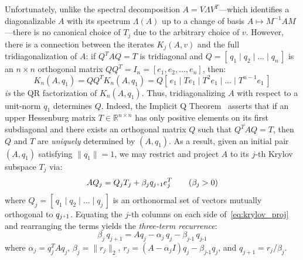\documentclass[10pt]{article}
\numberwithin{equation}{section}
\newcommand{\+}{%
	\raisebox{0.18ex}{\scaleobj{0.55}{+}}
}
\theoremstyle{definition}
\begin{document}
Unfortunately, unlike the spectral decomposition $A = V \Lambda V^T$---which identifies a diagonalizable $A$ with its spectrum $\Lambda(A)$ up to a change of basis $A \mapsto M^{-1} A M$---there is no canonical choice of $T_j$ due to the arbitrary choice of $v$. 
However, there is a connection between the iterates $K_j(A,v)$ and the full tridiagonalization of $A$: if $Q^T A Q = T$ is tridiagonal and $Q= [\, q_1 \mid q_2 \mid \dots \mid q_n \,]$ is an $n \times n$ orthogonal matrix $Q Q^T = I_n = [e_1, e_2, \dots, e_n]$, then:
\begin{equation}
	K_n(A, q_1) = Q Q^T K_n(A, q_1) = Q[ \, e_1 \mid T e_1 \mid T^2 e_1 \mid \dots \mid T^{n-1} e_1 \, ]
\end{equation}
\emph{is} the QR factorization of $K_n(A, q_1)$. Thus, tridiagonalizing $A$ with respect to a unit-norm $q_1$ determines $Q$. 
Indeed, the Implicit Q Theorem~\cite{golub2013matrix} asserts that if an upper Hessenburg matrix $T \in \mathbb{R}^{n \times n}$ has only positive elements on its first subdiagonal and there exists an orthogonal matrix $Q$ such that $Q^T A Q = T$, then $Q$ and $T$ are \emph{uniquely} determined by $(A, q_1)$. 
As a result, given an initial pair $(A, q_1)$ satisfying $\lVert q_1 \rVert = 1$, we may restrict and project $A$ to its $j$-th Krylov subspace $T_j$ via: 
\begin{equation}\label{eq:krylov_proj}
	A Q_j = Q_j T_j + \beta_j q_{j\+1} e_{j}^T \quad\quad (\beta_j > 0)
\end{equation}
where $Q_j = [\, q_1 \mid q_2 \mid \dots \mid q_j \,]$ is an orthonormal set of vectors mutually orthogonal to $q_{j\+1}$.
Equating the $j$-th columns on each side of~\eqref{eq:krylov_proj} and rearranging the terms yields the \emph{three-term recurrence}: 
\begin{equation}\label{eq:three_term_rec}
	 \beta_{j} \, q_{j+1} = A q_j - \alpha_j \, q_j - \beta_{j\text{-}1} \, q_{j\text{-}1}  
\end{equation}
where $\alpha_j = q_j^T A q_j$, $\beta_j = \lVert r_j \rVert_2$, $r_j = (A - \alpha_j I)q_j - \beta_{j\text{-}1} q_j$, and $q_{j+1} = r_j / \beta_j$. 
\end{document}
